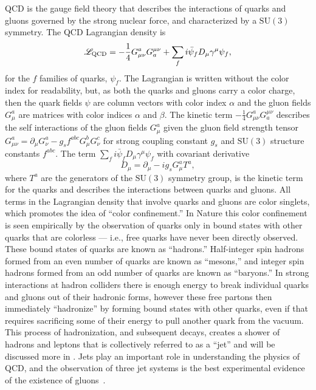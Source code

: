 \gls{QCD} is the gauge field theory that describes the interactions of quarks and gluons governed by the strong nuclear force, and characterized by a $\mathrm{SU}(3)$ symmetry.
The QCD Lagrangian density is
\begin{equation}
 \mathscr{L}_{\textrm{QCD}} = -\frac{1}{4}G_{\mu \nu}^{a} G_{a}^{\mu \nu} + \sum_{f} i \bar{\psi}_{f} D_{\mu} \gamma^{\mu} \psi_{f},
 \label{eq:QCD_Lagrangian}
\end{equation}
for the $f$ families of quarks, $\psi_{f}$.
The Lagrangian is written without the color index for readability, but, as both the quarks and gluons carry a color charge, then the quark fields $\psi$ are column vectors with color index $\alpha$ and the gluon fields $G_{\mu}^{a}$ are matrices with color indices $\alpha$ and $\beta$.
The kinetic term $-\frac{1}{4}G_{\mu \nu}^{a} G_{a}^{\mu \nu}$ describes the self interactions of the gluon fields $G_{\mu}^{a}$ given the gluon field strength tensor $G_{\mu\nu}^{a} = \partial_{\mu} G_{\nu}^{a} - g_{s} f^{abc} G_{\mu}^{b} G_{\nu}^{c}$
for strong coupling constant $g_{s}$ and $\mathrm{SU}(3)$ structure constants $f^{abc}$.
The term $\sum_{f} i \bar{\psi}_{f} D_{\mu} \gamma^{\mu} \psi_{f}$ with covariant derivative
\[
 D_{\mu} = \partial_{\mu} - i g_{s} G_{\mu}^{a} T^{a},
\]
where $T^{a}$ are the generators of the $\mathrm{SU}(3)$ symmetry group, is the kinetic term for the quarks and describes the interactions between quarks and gluons.
All terms in the Lagrangian density that involve quarks and gluons are color singlets, which promotes the idea of ``color confinement.''
In Nature this color confinement is seen empirically by the observation of quarks only in bound states with other quarks that are colorless --- i.e., free quarks have never been directly observed.
These bound states of quarks are known as ``hadrons.''
Half-integer spin hadrons formed from an even number of quarks are known as ``mesons,'' and integer spin hadrons formed from an odd number of quarks are known as ``baryons.''
In strong interactions at hadron colliders there is enough energy to break individual quarks and gluons out of their hadronic forms, however these free partons then immediately ``hadronize'' by forming bound states with other quarks, even if that requires sacrificing some of their energy to pull another quark from the vacuum.
This process of hadronization, and subsequent decays, creates a shower of hadrons and leptons that is collectively referred to as a ``jet'' and will be discussed more in .
Jets play an important role in understanding the physics of QCD, and the observation of three jet systems is the best experimental evidence of the existence of gluons~\cite{Brandelik:1979bd,Ellis:1978wp,Andersson:1983ia,Brandelik:1980vs}.

